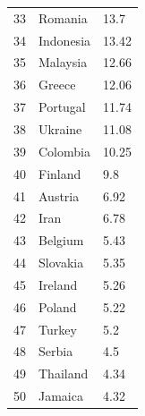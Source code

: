 \documentclass[geosciences,article,submit,moreauthors,pdftex]{Definitions/mdpi}
\begin{document}
\begin{tabular}{@{}p{0.5cm}<{}@{}p{9cm}<{\dotfill}@{}p{\dimexpr\linewidth-4cm}@{}}
33 & Romania & 13.7\\
34 & Indonesia & 13.42\\
35 & Malaysia & 12.66\\
36 & Greece & 12.06\\
37 & Portugal & 11.74\\
38 & Ukraine & 11.08\\
39 & Colombia & 10.25\\
40 & Finland & 9.8\\
41 & Austria & 6.92\\
42 & Iran & 6.78\\
43 & Belgium & 5.43\\
44 & Slovakia & 5.35\\
45 & Ireland & 5.26\\
46 & Poland & 5.22\\
47 & Turkey & 5.2\\
48 & Serbia & 4.5\\
49 & Thailand & 4.34\\
50 & Jamaica & 4.32\\
\end{tabular}



\end{document}

